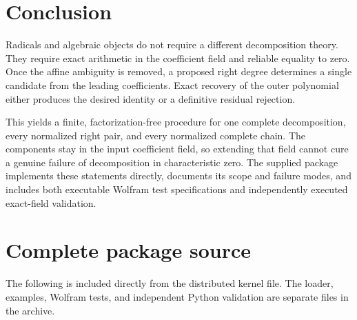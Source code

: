 \documentclass[11pt,a4paper]{article}
\theoremstyle{definition}
\newcommand{\code}[1]{\texttt{\detokenize{#1}}}
\begin{document}
\section{Conclusion}
Radicals and algebraic \code{Root} objects do not require a different decomposition theory. They require exact arithmetic in the coefficient field and reliable equality to zero. Once the affine ambiguity is removed, a proposed right degree determines a single candidate from the leading coefficients. Exact recovery of the outer polynomial either produces the desired identity or a definitive residual rejection.

This yields a finite, factorization-free procedure for one complete decomposition, every normalized right pair, and every normalized complete chain. The components stay in the input coefficient field, so extending that field cannot cure a genuine failure of decomposition in characteristic zero. The supplied package implements these statements directly, documents its scope and failure modes, and includes both executable Wolfram test specifications and independently executed exact-field validation.

\appendix
\section{Complete package source}
The following is included directly from the distributed kernel file. The loader, examples, Wolfram tests, and independent Python validation are separate files in the archive.

\end{document}
